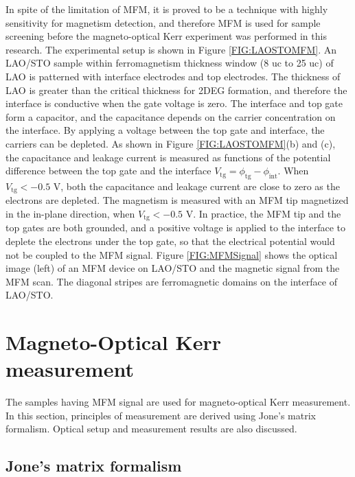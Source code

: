 \documentclass[pdflatex, sectionletters, 12pt]{pittetd}    %
\begin{document}
In spite of the limitation of MFM, it is proved to be a technique with highly sensitivity\cite{bi2014room} for magnetism detection, and therefore MFM is used for sample screening before the magneto-optical Kerr experiment was performed in this research. The experimental setup is shown in Figure \ref{FIG:LAOSTOMFM}. An LAO/STO sample within ferromagnetism thickness window (8 uc to 25 uc) of LAO\cite{bi2015laalo3} is patterned with interface electrodes and top electrodes. The thickness of LAO is greater than the critical thickness for 2DEG formation, and therefore the interface is conductive when the gate voltage is zero. The interface and top gate form a capacitor, and the capacitance depends on the carrier concentration on the interface. By applying a voltage between the top gate and interface, the carriers can be depleted. As shown in Figure \ref{FIG:LAOSTOMFM}(b) and (c), the capacitance and leakage current is measured as functions of the potential difference between the top gate and the interface $V_\mathrm{tg} = \phi_\mathrm{tg} - \phi_\mathrm{int}$. When $V_\mathrm{tg} < -0.5$ V, both the capacitance and leakage current are close to zero as the electrons are depleted. The magnetism is measured with an MFM tip magnetized in the in-plane direction, when $V_\mathrm{tg} < -0.5$ V. In practice, the MFM tip and the top gates are both grounded, and a positive voltage is applied to the interface to deplete the electrons under the top gate, so that the electrical potential would not be coupled to the MFM signal. Figure \ref{FIG:MFMSignal} shows the optical image (left) of an MFM device on LAO/STO and the magnetic signal from the MFM scan. The diagonal stripes are ferromagnetic domains on the interface of LAO/STO.

\section{Magneto-Optical Kerr measurement}

The samples having MFM signal are used for magneto-optical Kerr measurement. In this section, principles of measurement are derived using Jone's matrix formalism. Optical setup and measurement results are also discussed.

\subsection{Jone's matrix formalism}
\end{document}
